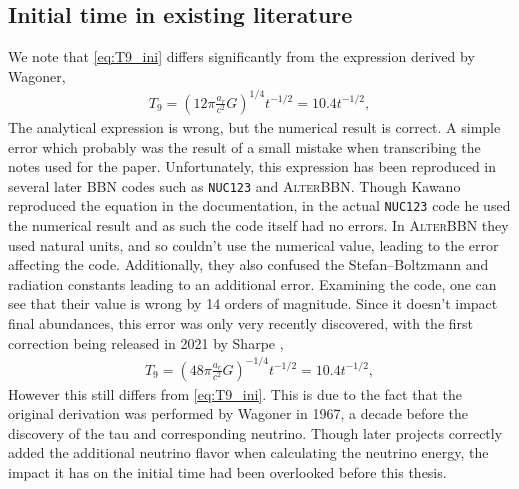 \subsection{Initial time in existing literature}
We note that \eqref{eq:T9_ini} differs significantly from the expression derived by Wagoner\cite{Wagoner67},
\begin{align}
    T_9=(12\pi\frac{a_r}{c^2}G)^{1/4}t^{-1/2}=10.4t^{-1/2},
\end{align}
The analytical expression is wrong, but the numerical result is correct. A simple error which probably was the result of a small mistake when transcribing the notes used for the paper. Unfortunately, this expression has been reproduced in several later BBN codes such as \texttt{NUC123}\cite{Kawano} and \textsc{AlterBBN}\cite{AlterBBN}. Though Kawano reproduced the equation in the documentation, in the actual \texttt{NUC123} code he used the numerical result and as such the code itself had no errors. In \textsc{AlterBBN} they used natural units, and so couldn't use the numerical value, leading to the error affecting the code. Additionally, they also confused the Stefan–Boltzmann and radiation constants leading to an additional error. Examining the code, one can see that their value is wrong by 14 orders of magnitude. %
Since it doesn't impact final abundances, this error was only very recently discovered, with the first correction being released in 2021 by Sharpe \cite{sharpe2021big},
\begin{align}
    T_9=(48\pi\frac{a_r}{c^2}G)^{-1/4}t^{-1/2}=10.4t^{-1/2},
\end{align}
However this still differs from \eqref{eq:T9_ini}. This is due to the fact that the original derivation was performed by Wagoner in 1967, a decade before the discovery of the tau and corresponding neutrino. Though later projects correctly added the additional neutrino flavor when calculating the neutrino energy, the impact it has on the initial time had been overlooked before this thesis. 









